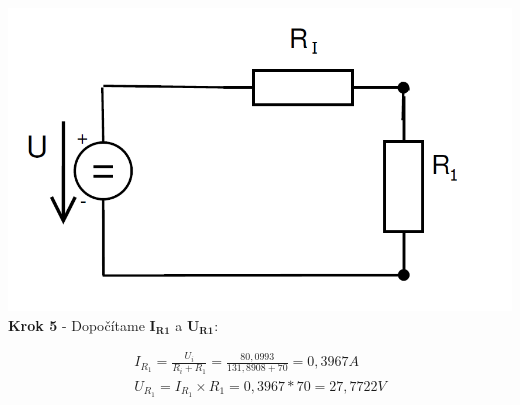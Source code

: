 \begin{center}
\includegraphics[scale=0.5,keepaspectratio]{fig/obr/Pr2_4.png} \\
\textbf{Krok 5} - Dopočítame  $\boldsymbol{I_{R1}}$ a  $\boldsymbol{U_{R1}}$:
\end{center}

\begin{gather*}
I_{R_{1}}=\frac{U_{i}}{R_{i}+R_{1}}=\frac{80,0993}{131,8908+70}=0,3967A \\
U_{R_{1}}=I_{R_{1}} \times R_{1}=0,3967*70=27,7722V\\
\end{gather*}
